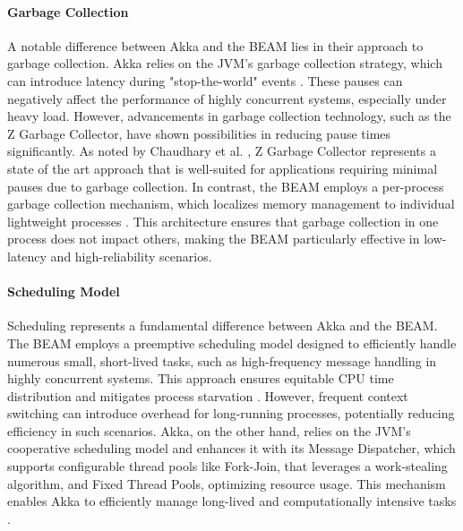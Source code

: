 \paragraph{Garbage Collection} A notable difference between Akka and the \gls{BEAM} lies in their approach to garbage collection. Akka relies on the \gls{JVM}’s garbage collection strategy, which can introduce latency during "stop-the-world" events \cite{akka-docs,Abraham2023}. These pauses can negatively affect the performance of highly concurrent systems, especially under heavy load. However, advancements in garbage collection technology, such as the Z Garbage Collector, have shown possibilities in reducing pause times significantly. As noted by Chaudhary et al. \cite{Chaudhary2024}, Z Garbage Collector represents a state of the art approach that is well-suited for applications requiring minimal pauses due to garbage collection. In contrast, the \gls{BEAM} employs a per-process garbage collection mechanism, which localizes memory management to individual lightweight processes \cite{Juric2024}. This architecture ensures that garbage collection in one process does not impact others, making the \gls{BEAM} particularly effective in low-latency and high-reliability scenarios.

\paragraph{Scheduling Model} Scheduling represents a fundamental difference between Akka and the \gls{BEAM}. The \gls{BEAM} employs a preemptive scheduling model designed to efficiently handle numerous small, short-lived tasks, such as high-frequency message handling in highly concurrent systems. This approach ensures equitable CPU time distribution and mitigates process starvation \cite{Juric2024,elixir-docs-hexdocs,erlang-concurrency-blog}. However, frequent context switching can introduce overhead for long-running processes, potentially reducing efficiency in such scenarios. Akka, on the other hand, relies on the \gls{JVM}’s cooperative scheduling model and enhances it with its Message Dispatcher, which supports configurable thread pools like Fork-Join, that leverages a work-stealing algorithm, and Fixed Thread Pools, optimizing resource usage. This mechanism enables Akka to efficiently manage long-lived and computationally intensive tasks \cite{akka-docs,Abraham2023}.

